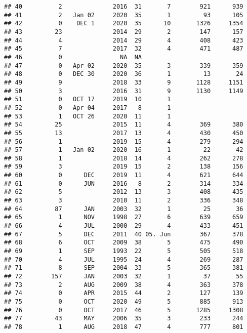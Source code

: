 \documentclass[
  english,
  man]{apa6}
\begin{document}
\begin{verbatim}
## 40          2              2016  31       7        921      939
## 41          2   Jan 02     2020  35       1         93      105
## 42          0    DEC 1     2020  35      10       1326     1354
## 43         23              2014  29       2        147      157
## 44          4              2014  29       4        408      423
## 45          7              2017  32       4        471      487
## 46          0                NA  NA                            
## 47          0   Apr 02     2020  35       3        339      359
## 48          0   DEC 30     2020  36       1         13       24
## 49          9              2018  33       9       1128     1151
## 50          3              2016  31       9       1130     1149
## 51          0   OCT 17     2019  10       1                    
## 52          0   Apr 04     2017   8       1                    
## 53          1   OCT 26     2020  11       1                    
## 54         25              2015  11       4        369      380
## 55         13              2017  13       4        430      450
## 56          1              2019  15       4        279      294
## 57          1   Jan 02     2020  16       1         22       42
## 58          1              2018  14       4        262      278
## 59          3              2019  15       2        138      156
## 60          0      DEC     2019  11       4        621      644
## 61          0      JUN     2016   8       2        314      334
## 62          5              2012  13       3        408      435
## 63          3              2010  11       2        336      348
## 64         87      JAN     2003  32       1         25       36
## 65          1      NOV     1998  27       6        639      659
## 66          4      JUL     2000  29       4        433      451
## 67          5      DEC     2011  40 05. Jun        367      378
## 68          6      OCT     2009  38       5        475      490
## 69          1      SEP     1993  22       5        505      518
## 70          4      JUL     1995  24       4        269      287
## 71          8      SEP     2004  33       5        365      381
## 72        157      JAN     2003  32       1         37       55
## 73          2      AUG     2009  38       4        363      378
## 74          0      APR     2015  44       2        127      139
## 75          0      OCT     2020  49       5        885      913
## 76          0      OCT     2017  46       5       1285     1308
## 77         43      MAY     2006  35       3        233      244
## 78          1      AUG     2018  47       4        777      801

\end{verbatim}
\end{document}
